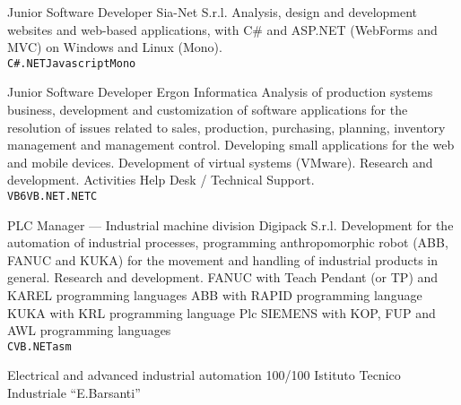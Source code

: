 \documentclass[9pt]{developercv}
\begin{document}
\begin{entrylist}
        {Junior Software Developer}
        {Sia-Net S.r.l.}
        {Analysis, design and development websites and web-based applications, with C\# and ASP.NET (WebForms and MVC) on Windows and Linux (Mono). \\
     \texttt{C\#}\slashsep\texttt{.NET}\slashsep\texttt{Javascript}\slashsep\texttt{Mono}}

        {Junior Software Developer}
        {Ergon Informatica}
        {Analysis of production systems business, development and customization of software applications for the resolution of issues related to sales, production, purchasing, planning, inventory management and management control. Developing small applications for the web and mobile devices. Development of virtual systems (VMware). Research and development. Activities Help Desk / Technical Support. \\
       \texttt{VB6}\slashsep\texttt{VB.NET}\slashsep\texttt{.NET}\slashsep\texttt{C}}

        {PLC Manager --- Industrial machine division}
        {Digipack S.r.l.}
        {Development for the automation of industrial processes, programming anthropomorphic robot (ABB, FANUC and KUKA) for the movement and handling of industrial products in general. Research and development. FANUC with Teach Pendant (or TP) and KAREL programming languages ABB with RAPID programming language KUKA with KRL programming language Plc SIEMENS with KOP, FUP and AWL programming languages \\
       \texttt{C}\slashsep\texttt{VB.NET}\slashsep\texttt{asm}}

\end{entrylist}



\begin{entrylist}
        {Electrical and advanced industrial automation 100/100}
        {Istituto Tecnico Industriale “E.Barsanti”}
        {}
\end{entrylist}
\end{document}
